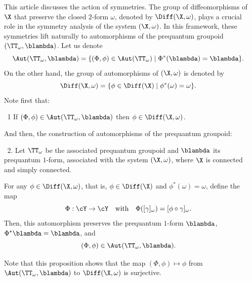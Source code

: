   \begin{article}
    \label{art:Automorphisms Induced by Symmetries}
    
    This article discusses the action of symmetries.
    The group of diffeomorphisms of $\X$ that preserve the closed $2$-form $\omega$,
    denoted by $\Diff(\X, \omega)$,
    plays a crucial role in the symmetry analysis of the system $(\X, \omega)$.
    In this framework,
    these symmetries lift naturally to automorphisms of the prequantum groupoid $(\TT_\omega, \blambda)$.
    Let us denote
    $$
      \Aut(\TT_\omega, \blambda) = \{ (\Phi,\phi) \in \Aut(\TT_\omega) \mid \Phi^*(\blambda) = \blambda \}.
      $$
    On the other hand,
    the group of automorphisms of $(\X,\omega)$ is denoted by
    $$
      \Diff(\X,\omega) = \{ \phi \in \Diff(\X) \mid \phi^*(\omega) = \omega \}.
      $$
    Note first that:
    
    \begin{proposition}{~1}
      If $(\Phi,\phi) \in \Aut(\TT_\omega,\blambda)$ then $\phi \in \Diff(\X,\omega)$.
    \end{proposition}
    
    And then,
    the construction of automorphisms of the prequantum groupoid:
    
    \begin{proposition}{~2.}
      Let $\TT_\omega$ be the associated prequantum groupoid and $\blambda$ its prequantum $1$-form,
      associated with the system $(\X,\omega)$,
      where $\X$ is connected and simply connected.
      
      For any $\phi \in \Diff(\X, \omega)$,
      that is,
      $\phi \in \Diff(\X)$ and $\phi^*(\omega) = \omega$,
      define the map
      $$
        \Phi: \cY \to \cY
        \quad \text{with} \quad
        \Phi([\gamma]_\omega) = [\phi \circ \gamma]_\omega.
        $$
      Then,
      this automorphism preserves the prequantum $1$-form $\blambda$,
      $\Phi^* \blambda = \blambda$,
      and
      $$
        (\Phi, \phi) \in \Aut(\TT_\omega,\blambda).
        $$
    \end{proposition}
    
    Note that this proposition shows that the map $(\Phi,\phi) \mapsto \phi$ from $\Aut(\TT_\omega,\blambda)$ to $\Diff(\X,\omega)$ is surjective.
    
  \end{article}
  
